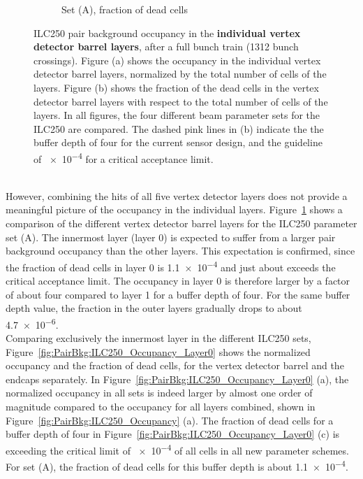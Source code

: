\begin{figure}
\begin{subfigure}[b]{0.49\textwidth}
   \caption{Set (A), fraction of dead cells}
   \end{subfigure}
   \caption[Pair background occupancy in the \sid vertex detector barrel layers for the ILC250 SetA]{ILC250 pair background occupancy in the \textbf{individual \sid vertex detector barrel layers}, after a full bunch train (\num{1312} bunch crossings).
   Figure (a) shows the occupancy in the individual vertex detector barrel layers, normalized by the total number of cells of the layers.
   Figure (b) shows the fraction of the dead cells in the vertex detector barrel layers with respect to the total number of cells of the layers.
   In all figures, the four different beam parameter sets for the ILC250 are compared.
   The dashed pink lines in (b) indicate the the buffer depth of four for the current sensor design, and the guideline of \num{e-4} for a critical acceptance limit.
   }
   \label{fig:PairBkg:ILC250_Occupancy_VXD_BarrelLayers}
 \end{figure}
\\However, combining the hits of all five vertex detector layers does not provide a meaningful picture of the occupancy in the individual layers.
Figure~\ref{fig:PairBkg:ILC250_Occupancy_VXD_BarrelLayers} shows a comparison of the different vertex detector barrel layers for the ILC250 parameter set (A).
The innermost layer (layer 0) is expected to suffer from a larger pair background occupancy than the other layers.
This expectation is confirmed, since the fraction of dead cells in layer 0 is \num{1.1e-4} and just about exceeds the critical acceptance limit.
The occupancy in layer 0 is therefore larger by a factor of about four compared to layer 1 for a buffer depth of four.
For the same buffer depth value, the fraction in the outer layers gradually drops to about \num{4.7e-6}.
\\Comparing exclusively the innermost layer in the different ILC250 sets, Figure~\ref{fig:PairBkg:ILC250_Occupancy_Layer0} shows the normalized occupancy and the fraction of dead cells, for the vertex detector barrel and the endcaps separately.
In Figure~\ref{fig:PairBkg:ILC250_Occupancy_Layer0} (a), the normalized occupancy in all sets is indeed larger by almost one order of magnitude compared to the occupancy for all layers combined, shown in Figure~\ref{fig:PairBkg:ILC250_Occupancy} (a).
The fraction of dead cells for a buffer depth of four in Figure~\ref{fig:PairBkg:ILC250_Occupancy_Layer0} (c) is exceeding the critical limit of \num{e-4} of all cells in all new parameter schemes.
For set (A), the fraction of dead cells for this buffer depth is about \num{1.1e-4}.
